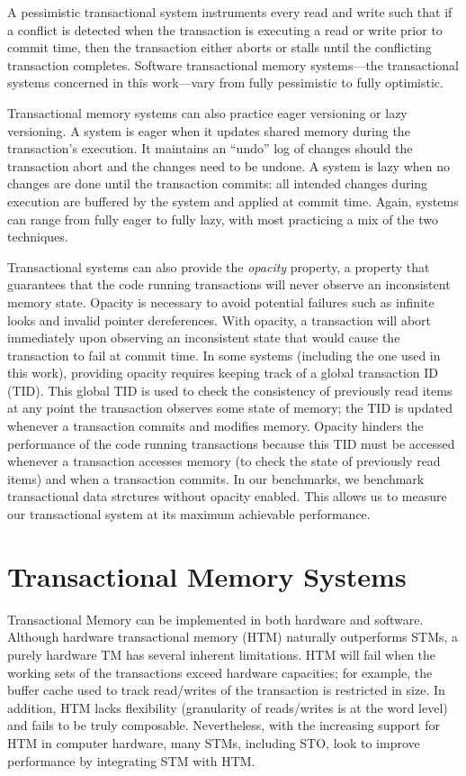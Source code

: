 A pessimistic transactional system instruments every read and write such that if a conflict is detected when the transaction is executing a read or write prior to commit time, then the transaction either aborts or stalls until the conflicting transaction completes. Software transactional memory systems---the transactional systems concerned in this work---vary from fully pessimistic to fully optimistic.

Transactional memory systems can also practice eager versioning or lazy versioning. A system is eager when it updates shared memory during the transaction's execution. It maintains an ``undo'' log of changes should the transaction abort and the changes need to be undone. A system is lazy when no changes are done until the transaction commits: all intended changes during execution are buffered by the system and applied at commit time. Again, systems can range from fully eager to fully lazy, with most practicing a mix of the two techniques.

Transactional systems can also provide the \emph{opacity} property\cite{opacity}, a property that guarantees that the code running transactions will never observe an inconsistent memory state. Opacity is necessary to avoid potential failures such as infinite looks and invalid pointer dereferences. With opacity, a transaction will abort immediately upon observing an inconsistent state that would cause the transaction to fail at commit time. 
In some systems (including the one used in this work), providing opacity requires keeping track of a global transaction ID (TID). This global TID is used to check the consistency of previously read items at any point the transaction observes some state of memory; the TID is updated whenever a transaction commits and modifies memory. Opacity hinders the performance of the code running transactions because this TID must be accessed whenever a transaction accesses memory (to check the state of previously read items) and when a transaction commits. In our benchmarks, we benchmark transactional data strctures without opacity enabled. This allows us to measure our transactional system at its maximum achievable performance.

\section{Transactional Memory Systems}
Transactional Memory can be implemented in both hardware and software. Although hardware transactional memory (HTM) naturally outperforms STMs, a purely hardware TM has several inherent limitations. HTM will fail when the working sets of the transactions exceed hardware capacities; for example, the buffer cache used to track read/writes of the transaction is restricted in size. In addition, HTM lacks flexibility (granularity of reads/writes is at the word level) and fails to be truly composable\cite{htm}. Nevertheless, with the increasing support for HTM in computer hardware, many STMs, including STO, look to improve performance by integrating STM with HTM.

